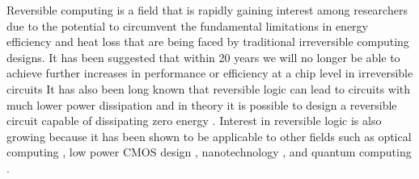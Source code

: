 Reversible computing is a field that is rapidly gaining interest among researchers due 
to the potential to circumvent the fundamental limitations in energy efficiency and heat 
loss that are being faced by traditional irreversible computing designs. It has been 
suggested that within 20 years we will no longer be able to achieve further increases in 
performance or efficiency at a chip level in irreversible circuits \cite{Frank2005} It has 
also been long known that reversible logic can lead to circuits with much lower power 
dissipation \cite{Landauer61} and in theory it is possible to design a reversible 
circuit capable of dissipating zero energy \cite{Bennett73}. Interest in reversible logic 
is also growing because it has been shown to be applicable to other fields such as 
optical computing \cite{Picton91}, low power CMOS design \cite{Athas94}, 
nanotechnology \cite{Merkle1993}, and quantum computing \cite{AlRabadi2004}.